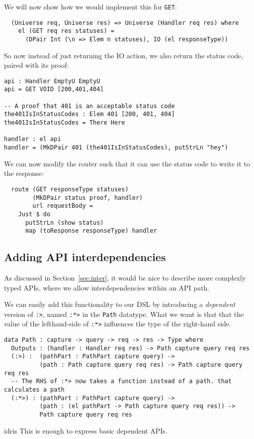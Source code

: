 \documentclass[12pt,a4paper]{article}
\begin{document}
We will now show how we would implement this for \texttt{GET}:
\begin{verbatim}
  (Universe req, Universe res) => Universe (Handler req res) where
    el (GET req res statuses) =
      (DPair Int (\n => Elem n statuses), IO (el responseType))
\end{verbatim}
So now instead of just returning the IO action, we also return the status code, paired with its proof:
\begin{verbatim}
api : Handler EmptyU EmptyU
api = GET VOID [200,401,404]

-- A proof that 401 is an acceptable status code
the401IsInStatusCodes : Elem 401 [200, 401, 404]
the401IsInStatusCodes = There Here

handler : el api
handler = (MkDPair 401 (the401IsInStatusCodes), putStrLn "hey")
\end{verbatim}
We can now modify the router such that it can use the status code to write it to the response:
\begin{verbatim}
  route (GET responseType statuses)
        (MkDPair status proof, handler)
        url requestBody =
    Just $ do
      putStrLn (show status)
      map (toResponse responseType) handler
\end{verbatim}

\subsection{Adding API interdependencies}
As discussed in Section~\ref{sec:inter}, it would be nice to describe more complexly typed APIs, where we allow interdependencies within an API path.

We can easily add this functionality to our DSL by introducing a \emph{dependent} version of \texttt{:>}, named
\texttt{:*>} in the \texttt{Path} datatype.
What we want is that that the value of the lefthand-side of \texttt{:*>} influences the type of the right-hand side.
\begin{verbatim}
data Path : capture -> query -> req -> res -> Type where
  Outputs : (handler : Handler req res) -> Path capture query req res
  (:>) :  (pathPart : PathPart capture query) ->
          (path : Path capture query req res) -> Path capture query req res
  -- The RHS of :*> now takes a function instead of a path. that calculates a path
  (:*>) : (pathPart : PathPart capture query) ->
          (path : (el pathPart -> Path capture query req res)) ->
          Path capture query req res
\end{verbatim}{idris}
This is enough to express basic dependent APIs.
\end{document}
